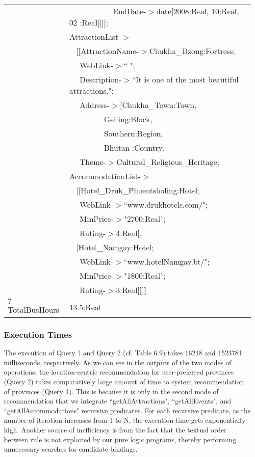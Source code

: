 \begin{table} [tbph]
\begin{tabular}{|l|l|}
             &$~~~~~~~~~~~~~~~~~~~~~~~~~$EndDate-$>$date[2008:Real, 10:Real, 02 :Real]]]]; \\	     
		   &AttractionList-$>$\\
  				   &$~~~~$[[AttractionName-$>$Chukha\_Dzong:Fortress;\\
				   &$~~~~~~$WebLink-$>$`` "; \\
				   &$~~~~~~$Description-$>$``It is one of the most beautiful attractions.";\\
				   &$~~~~~~$Address-$>$[Chukha\_Town:Town, \\
		          &$~~~~~~~~~~~~~~~~~~~~$Gelling:Block, \\
		           &$~~~~~~~~~~~~~~~~~~~~$Southern:Region, \\
		           &$~~~~~~~~~~~~~~~~~~~~$Bhutan :Country,\\
				   &$~~~~~~$Theme-$>$Cultural\_Religious\_Heritage;\\
          
		   &AccommodationList-$>$\\
  				   &$~~~~$[[Hotel\_Druk\_Phuentsholing:Hotel; \\
			       &$~~~~~~$WebLink-$>$``www.drukhotels.com/"; \\
                   &$~~~~~~$MinPrice-$>$"2700:Real";\\
				   &$~~~~~~$Rating-$>$4:Real], \\
		           &$~~~~$[Hotel\_Namgay:Hotel;  \\
			       &$~~~~~~$WebLink-$>$``www.hotelNamgay.bt/"; \\
                   &$~~~~~~$MinPrice-$>$"1800:Real";\\
				   &$~~~~~~$Rating-$>$3:Real]]]] \\	
\hline				   
$?$TotalBusHours  &13.5:Real\\
\hline			   
\end{tabular} 
\end{table} 
       
 
\subsubsection{Execution Times}
\hspace{0.3in}The execution of Query 1 and Query 2 (cf. Table 6.9) takes 16218 and 1523781 milliseconds, respectively. As we can see in the outputs of the two modes of operations, the location-centric recommendation for user-preferred provinces (Query 2) takes comparatively large amount of time to system recommendation of provinces (Query 1). This is because it is only in the second mode of recommendation that we integrate ``getAllAttractions", ``getAllEvents", and ``getAllAccommodations" recursive predicates. For each recursive predicate, as the number of iteration increases from 1 to N, the execution time gets exponentially high. Another source of inefficiency is from the fact that the textual order between rule is not exploited by our pure logic programs, thereby performing unnecessary searches for candidate bindings. %

